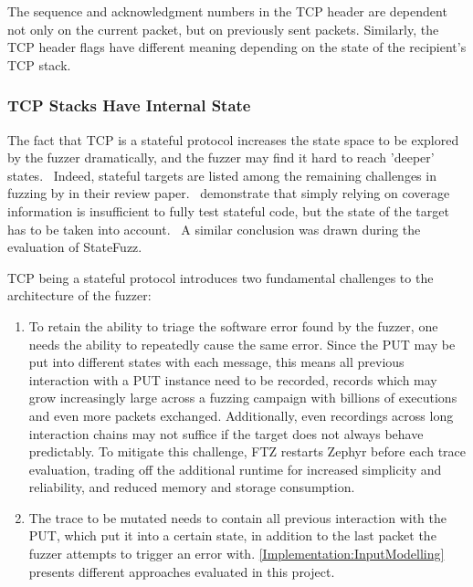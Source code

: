 \documentclass[twocolumn]{article}
\newcommand{\proj}{FTZ\xspace}
\let\savedCite=\cite
\renewcommand{\cite}{\unskip~\savedCite}
\begin{document}
The sequence and acknowledgment numbers in the TCP header are dependent not only on the current packet, but on previously sent packets. Similarly, the TCP header flags have different meaning depending on the state of the recipient's TCP stack.

\subsubsection{TCP Stacks Have Internal State}
\label{Background:TcpIsStateful}

The fact that TCP is a stateful protocol increases the state space to be explored by the fuzzer dramatically, and the fuzzer may find it hard to reach 'deeper' states.\cite{StatefulReview} Indeed, stateful targets are listed among the remaining challenges in fuzzing by \citeauthor{ChallengesAndReflections} in their review paper.\cite{ChallengesAndReflections} \citeauthor{SGFuzz} demonstrate that simply relying on coverage information is insufficient to fully test stateful code, but the state of the target has to be taken into account.\cite{SGFuzz} A similar conclusion was drawn during the evaluation of StateFuzz.\cite{StateFuzz}

TCP being a stateful protocol introduces two fundamental challenges to the architecture of the fuzzer:
\begin{enumerate}
  \item To retain the ability to triage the software error found by the fuzzer, one needs the ability to repeatedly cause the same error. Since the PUT may be put into different states with each message, this means all previous interaction with a PUT instance need to be recorded, records which may grow increasingly large across a fuzzing campaign with billions of executions and even more packets exchanged. Additionally, even recordings across long interaction chains may not suffice if the target does not always behave predictably. To mitigate this challenge, \proj restarts Zephyr before each trace evaluation, trading off the additional runtime for increased simplicity and reliability, and reduced memory and storage consumption.
  \item The trace to be mutated needs to contain all previous interaction with the PUT, which put it into a certain state, in addition to the last packet the fuzzer attempts to trigger an error with. \cref{Implementation:InputModelling} presents different approaches evaluated in this project.
\end{enumerate}
\end{document}
